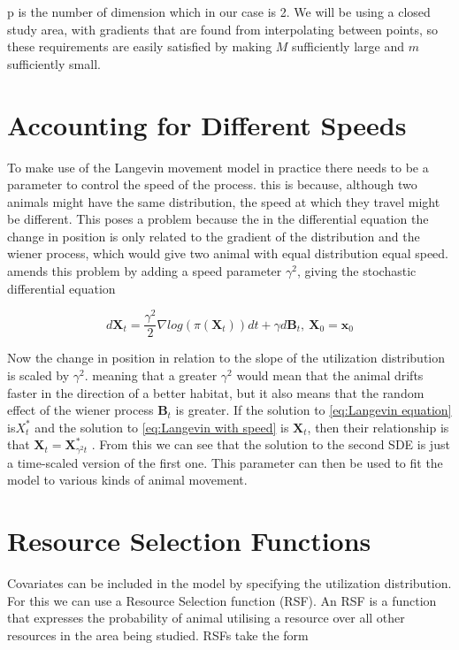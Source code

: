 p is the number of dimension which in our case is 2. We will be using a closed study area, with gradients that are found from interpolating between points, so these requirements are easily satisfied by making $M$ sufficiently large and $m$ sufficiently small.


\section{Accounting for Different Speeds}

To make use of the Langevin movement model in practice there needs to be a parameter to control the speed of the process. this is because, although two animals might have the same distribution, the speed at which they travel might be different. This poses a problem because the in the differential equation the change in position is only related to the gradient of the distribution and the wiener process, which would give two animal with equal distribution equal speed. \cite{roberts_optimal_1998} amends this problem by adding a speed parameter $\gamma^2$, giving the stochastic differential equation

\begin{equation}
    d\textbf{X}_t = \frac{\gamma^2}{2} \nabla log(\pi(\textbf{X}_t))dt + \gamma d\textbf{B}_t, \ \textbf{X}_0 = \textbf{x}_0
    \label{eq:Langevin with speed}
\end{equation}


Now the change in position in relation to the slope of the utilization distribution is scaled by $\gamma^2$. meaning that a greater $\gamma^2$ would mean that the animal drifts faster in the direction of a better habitat, but it also means that the random effect of the wiener process $\textbf{B}_t$ is greater. If the solution to \eqref{eq:Langevin equation} is$X^*_t$ and the solution to \eqref{eq:Langevin with speed} is $\textbf{X}_t$, then their relationship is that $\textbf{X}_t = \textbf{X}^*_{\gamma^2 t}$ \textcite{michelot_langevin_2019}. From this we can see that the solution to the second SDE is just a time-scaled version of the first one. This parameter can then be used to fit the model to various kinds of animal movement.


\section{Resource Selection Functions}

Covariates can be included in the model by specifying the utilization distribution. For this we can use a Resource Selection function (RSF). An RSF is a function that expresses the probability of animal utilising a resource over all other resources in the area being studied. RSFs take the form


